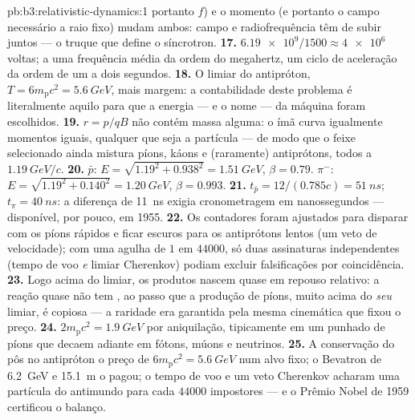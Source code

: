 \begin{solution}{pb:b3:relativistic-dynamics:1}
portanto $f$) e o momento (e portanto o campo necessário a raio fixo)
mudam ambos: campo e radiofrequência têm de subir juntos --- o truque
que define o síncrotron.
\textbf{17.} $\num{6.19e9}/1500 \approx \num{4e6}$ voltas; a uma
frequência média da ordem do megahertz, um ciclo de aceleração da
ordem de um a dois segundos.
\textbf{18.} O limiar do antipróton, $T = 6m_{\text{p}}c^2 =
\qty{5.6}{GeV}$, mais margem: a contabilidade deste problema é
literalmente aquilo para que a energia --- e o nome --- da máquina
foram escolhidos.
\textbf{19.} $r = p/qB$ não contém massa alguma: o ímã curva
igualmente momentos iguais, qualquer que seja a partícula --- de modo
que o feixe selecionado ainda mistura píons, káons e (raramente)
antiprótons, todos a $\qty{1.19}{GeV}/c$.
\textbf{20.} $\bar p$: $E = \sqrt{1.19^2 + 0.938^2} =
\qty{1.51}{GeV}$, $\beta = 0.79$. $\pi^-$: $E = \sqrt{1.19^2 +
0.140^2} = \qty{1.20}{GeV}$, $\beta = 0.993$.
\textbf{21.} $t_{\bar p} = 12/(0.785c) = \qty{51}{ns}$; $t_\pi =
\qty{40}{ns}$: a diferença de \qty{11}{ns} exigia cronometragem em
nanossegundos --- disponível, por pouco, em 1955.
\textbf{22.} Os contadores foram ajustados para disparar com os píons
rápidos e ficar escuros para os antiprótons lentos (um veto de
velocidade); com uma agulha de $1$ em $44000$, só duas assinaturas
independentes (tempo de voo \emph{e} limiar Cherenkov) podiam excluir
falsificações por coincidência.
\textbf{23.} Logo acima do limiar, os produtos nascem quase em repouso
relativo: a reação quase não tem , ao passo que a
produção de píons, muito acima do \emph{seu} limiar, é copiosa --- a
raridade era garantida pela mesma cinemática que fixou o preço.
\textbf{24.} $2m_{\text{p}}c^2 = \qty{1.9}{GeV}$ por aniquilação,
tipicamente em um punhado de píons que decaem adiante em fótons, múons
e neutrinos.
\textbf{25.} A conservação do  pôs no antipróton o preço
de $6m_{\text{p}}c^2 = \qty{5.6}{GeV}$ num alvo fixo; o Bevatron de
\qty{6.2}{GeV} e \qty{15.1}{m} o pagou; o tempo de voo e um veto
Cherenkov acharam uma partícula do antimundo para cada $44000$
impostores --- e o Prêmio Nobel de 1959 certificou o balanço.
\end{solution}
